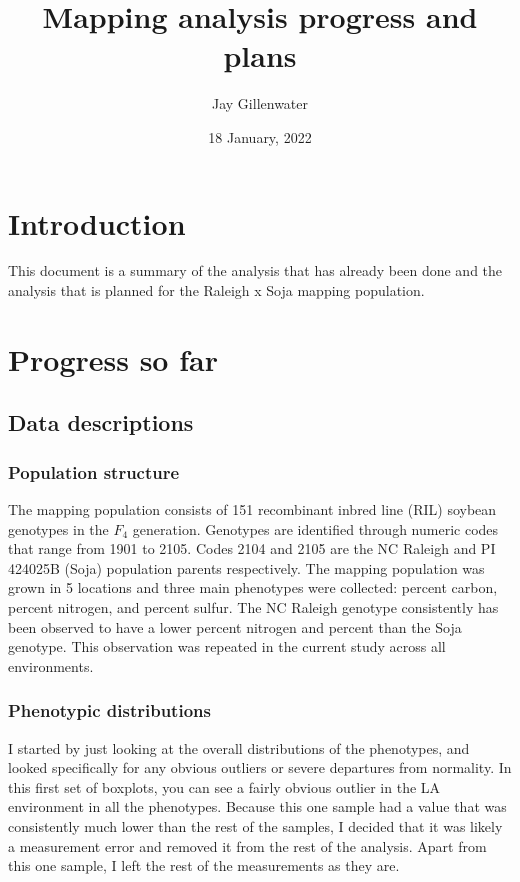 \documentclass[
]{article}
\title{Mapping analysis progress and plans}
\author{Jay Gillenwater}
\date{18 January, 2022}
\begin{document}
\maketitle

\hypertarget{introduction}{%
\section{Introduction}\label{introduction}}

This document is a summary of the analysis that has already been done
and the analysis that is planned for the Raleigh x Soja mapping
population.

\hypertarget{progress-so-far}{%
\section{Progress so far}\label{progress-so-far}}

\hypertarget{data-descriptions}{%
\subsection{Data descriptions}\label{data-descriptions}}

\hypertarget{population-structure}{%
\subsubsection{Population structure}\label{population-structure}}

The mapping population consists of 151 recombinant inbred line (RIL)
soybean genotypes in the \(F_4\) generation. Genotypes are identified
through numeric codes that range from 1901 to 2105. Codes 2104 and 2105
are the NC Raleigh and PI 424025B (Soja) population parents
respectively. The mapping population was grown in 5 locations and three
main phenotypes were collected: percent carbon, percent nitrogen, and
percent sulfur. The NC Raleigh genotype consistently has been observed
to have a lower percent nitrogen and percent than the Soja genotype.
This observation was repeated in the current study across all
environments.

\hypertarget{phenotypic-distributions}{%
\subsubsection{Phenotypic
distributions}\label{phenotypic-distributions}}

I started by just looking at the overall distributions of the
phenotypes, and looked specifically for any obvious outliers or severe
departures from normality. In this first set of boxplots, you can see a
fairly obvious outlier in the LA environment in all the phenotypes.
Because this one sample had a value that was consistently much lower
than the rest of the samples, I decided that it was likely a measurement
error and removed it from the rest of the analysis. Apart from this one
sample, I left the rest of the measurements as they are.
\end{document}
